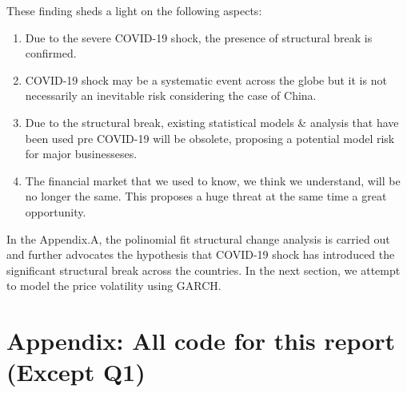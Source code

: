 \documentclass[
  11pt,
]{article}
\providecommand{\tightlist}{%
  \setlength{\itemsep}{0pt}\setlength{\parskip}{0pt}}
\begin{document}
These finding sheds a light on the following aspects:

\begin{enumerate}
\def\labelenumi{\arabic{enumi}.}
\tightlist
\item
  Due to the severe COVID-19 shock, the presence of structural break is
  confirmed.
\item
  COVID-19 shock may be a systematic event across the globe but it is
  not necessarily an inevitable risk considering the case of China.
\item
  Due to the structural break, existing statistical models \& analysis
  that have been used pre COVID-19 will be obsolete, proposing a
  potential model risk for major businesseses.
\item
  The financial market that we used to know, we think we understand,
  will be no longer the same. This proposes a huge threat at the same
  time a great opportunity.
\end{enumerate}

In the Appendix.A, the polinomial fit structural change analysis is
carried out and further advocates the hypothesis that COVID-19 shock has
introduced the significant structural break across the countries. In the
next section, we attempt to model the price volatility using GARCH.

\hypertarget{appendix-all-code-for-this-report-except-q1}{%
\section{Appendix: All code for this report (Except
Q1)}\label{appendix-all-code-for-this-report-except-q1}}
\end{document}
